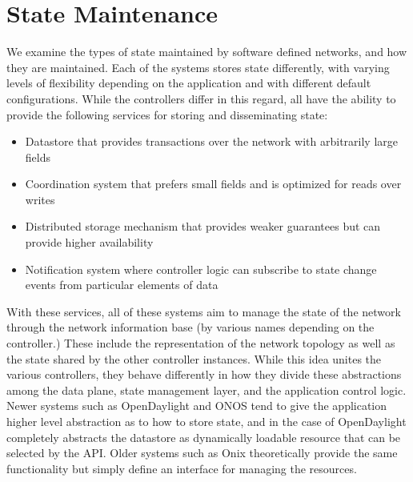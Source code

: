 \documentclass[letterpaper,twocolumn,10pt]{article}
\begin{document}

\section{State Maintenance}

We examine the types of state maintained by software defined networks, and how they are maintained. Each of the systems stores state differently, with varying levels of flexibility depending on the application and with different default configurations. While the controllers differ in this regard, all have the ability to provide the following services for storing and disseminating state:

\begin{itemize}
\item Datastore that provides transactions over the network with arbitrarily large fields
\item Coordination system that prefers small fields and is optimized for reads over writes
\item Distributed storage mechanism that provides weaker guarantees but can provide higher availability
\item Notification system where controller logic can subscribe to state change events from particular elements of data
\end{itemize}

With these services, all of these systems aim to manage the state of the network through the network information base (by various names depending on the controller.) These include the representation of the network topology as well as the state shared by the other controller instances. While this idea unites the various controllers, they behave differently in how they divide these abstractions among the data plane, state management layer, and the application control
logic. Newer systems such as OpenDaylight and ONOS tend to give the application higher level abstraction as to how to store state, and in the case of OpenDaylight completely abstracts the datastore as dynamically loadable resource that can be selected by the API. Older systems such as Onix theoretically provide the same functionality but simply define an interface for managing the resources. 
\end{document}
